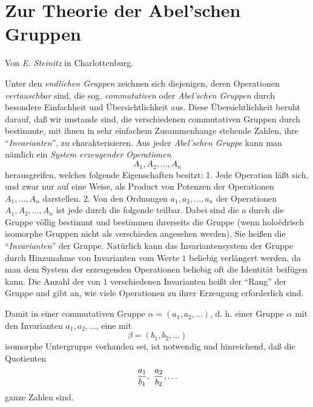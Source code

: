 \documentclass[11pt,a4paper]{article}
\begin{document}
\section*{Zur Theorie der Abel'schen Gruppen}
\begin{center}
Von \emph{E. Steinitz} in Charlottenburg.
\end{center}

Unter den \emph{endlichen Gruppen} zeichnen sich diejenigen, deren Operationen \emph{vertauschbar} sind, die sog. \emph{commutativen} oder \emph{Abel'schen Gruppen} durch besondere Einfachheit und Übersichtlichkeit aus. Diese Übersichtlichkeit beruht darauf, daß wir imstande sind, die verschiedenen commutativen Gruppen durch bestimmte, mit ihnen in sehr einfachem Zusammenhange stehende Zahlen, ihre ``\emph{Invarianten}'', zu charakterisieren. Aus jeder \emph{Abel'schen Gruppe} kann man nämlich ein \emph{System erzeugender Operationen}
\[
 A_1,A_2,\ldots,A_n
\]
herausgreifen, welches folgende Eigenschaften besitzt: 1. Jede Operation läßt sich, und zwar nur auf eine Weise, als Product von Potenzen der Operationen $A_1,\ldots,A_n$ darstellen. 2. Von den Ordnungen $a_1,a_2,\ldots,a_n$ der Operationen $A_1,A_2,\ldots,A_n$ ist jede durch die folgende teilbar. Dabei sind die $a$ durch die Gruppe völlig bestimmt und bestimmen ihrerseits die Gruppe (wenn holo\"edrisch isomorphe Gruppen nicht als verschieden angesehen werden). Sie heißen die ``\emph{Invarianten}'' der Gruppe. Natürlich kann das Invariantensystem der Gruppe durch Hinzunahme von Invarianten vom Werte $1$ beliebig verlängert werden, da man dem System der erzeugenden Operationen beliebig oft die Identität beifügen kann. Die Anzahl der von $1$ verschiedenen Invarianten heißt der ``Rang'' der Gruppe und gibt an, wie viele Operationen zu ihrer Erzeugung erforderlich sind.

Damit in einer commutativen Gruppe $\alpha=(a_1,a_2,\ldots)$, d. h. einer Gruppe $\alpha$ mit den Invarianten $a_1,a_2,\ldots$, eine mit
\[
 \beta=(b_1,b_2,\ldots)
\]
isomorphe Untergruppe vorhanden sei, ist notwendig und hinreichend, daß die Quotienten
\[
 {a_1\over b_1},\ {a_2\over b_2},\ldots
\]
ganze Zahlen sind.
\end{document}
